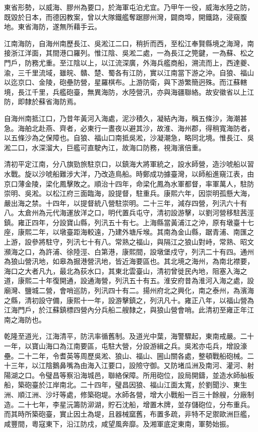 \begin{pinyinscope}
東省形勢，以威海、膠州為要口，於海軍屯泊尤宜。乃甲午一役，威海水陸之防，既毀於日本，而德因教案，曾以大隊鐵艦奪踞膠州灣，闢商埠，開鐵路，浸窺腹地。東省海防，遂無所藉手云。

江南海防，自海州南歷長江、吳淞江二口，稍折而西，至松江奉賢縣境之海灣，南接浙江洋面，其間港口羅列。惟江陰、吳淞二處，一為長江之筦鍵，一為蘇、松之門戶，防務尤重。至江陰以上，以江流深廣，外海兵艦商船，溯流而上，西達夔、渝，三千里流域，雖皖、贛、楚、蜀各有江防，實以江南當下游之沖。自狼、福山以迄京口、金陵，砲壘防營，星羅棋布。上游防衛，與下游繁簡迥殊。而江蘇轄境，長江千里，兵艦砲臺，無異海防，水陸營汛，亦與海疆聯絡。故安徽省以上江防，即隸於蘇省海防焉。

自海州南抵江口，乃昔年黃河入海處，泥沙積久，凝結內海，稱五條沙，海潮甚急。海舶北赴燕、齊者，必東行一晝夜以避其沙，故淮、海州郡，得稍寬海防者，以五條沙為之保障也。自狼、福山口南抵吳淞，沙凝潮急，略同北境。惟長江、吳淞二口，水深溜大，巨艦可直駛內江，故海口防務，視海濱倍重。

清初平定江南，分八旗勁旅駐京口，以鎮海大將軍統之，設水師營，造沙唬船以習水戰。旋以沙唬船難涉大洋，乃改造鳥船。時鄭成功據臺灣，以師船進窺江表，由京口薄金陵，梁化鳳擊敗之。順治十四年，命梁化鳳為水軍都督，率軍萬人，駐防崇明、吳淞。以松江府三面臨海，設提督，駐重兵。康熙六年，因崇明孤懸大海，嚴出海之禁。十四年，以提督統八營駐崇明。二十三年，減存四營，列汛六十有八。太倉州為元代海運放洋之口，明代置兵屯守，清初設游擊，以劉河營移駐茜涇鎮。雍正四年，分設寶山縣，列汛五十有七。上海縣當黃浦江之沖，原有墩臺十七座，康熙二年，以墩臺距海較遠，乃建外塘斥堠。其南為金山縣，踞青浦、南匯之上游，設參將駐守，列汛七十有八。常熟之福山，與隔江之狼山對峙，常熟、昭文瀕海之口，為許浦、徐陸涇、白第港，康熙間，設墩堡戍守，列汛二十有四。通州為狼山營汛地，如皋為掘港營汛地，皆近海要區也。其北境之海州，為南北襟要，海口之大者凡九，最北為荻水口，其東北雲臺山，清初曾徙民內地，阻塞入海之道，康熙二十年復開通，設通海營，列汛五十有五。淮安府昔為淮河入海之處，設廟灣、鹽城二營，會哨巡防，列汛四十有二。揚州府北之興化，南之泰州，為濱海之縣，清初設守備，康熙十一年，設游擊鎮之，列汛凡十。雍正八年，以福山營為江海門戶，於江蘇鎮標四營內分兵船二艘隸之，與狼山營會哨。此清初至雍正年江南之海防也。

乾隆至道光，江海清平，防汛率循舊制。及道光中葉，海警驟起，東南戒嚴。二十一年，以寶山海口為江南要區，屯駐大營，分設游緝之兵。吳淞亦屯兵，增設濠壘。二十二年，令耆英等周歷吳淞、狼山、福山、圌山關各處，整頓戰船砲械。二十三年，以江陰鵝鼻嘴為由海入江要口，設險守御。又防堵瓜洲及南河、灌河、射陽湖之口。令璧昌等察沿海城邑，聯絡保障。所用砲位，設局開鑄，並造水師舢板船，築砲臺於江岸南北。二十四年，璧昌因狼、福山江面太寬，於劉聞沙、東生洲、順江洲、沙圩等處，修築砲堤。水師各營，增大小戰船一百三十餘艘，分廠制造。二十七年，李星沅籌防泖湖，貯石沈船，增置木牌，並存儲砲位，分布重兵。而其時所築砲臺，實止因土為堤，且器械窳舊，布置多疏，非特不足禦歐洲巨艦，咸豐間，粵寇東下，沿江防戍，咸望風奔靡。及湘軍底定東南，軍勢始振。


\end{pinyinscope}
